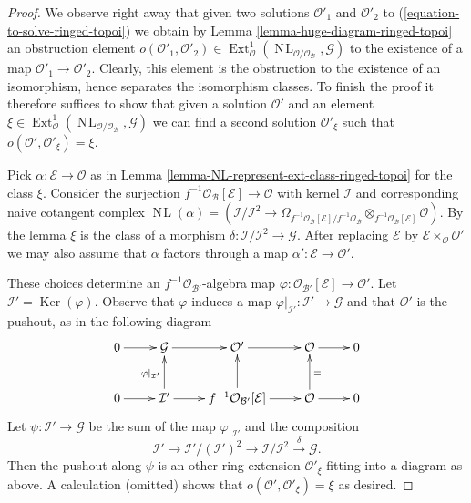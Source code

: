 \documentclass[10pt,a4paper]{amsart}
\theoremstyle{plain}
\theoremstyle{definition}
\theoremstyle{remark}
\numberwithin{equation}{subsection}
\def\Ext{\mathop{\mathrm{Ext}}\nolimits}
\def\NL{\mathop{N\!L}\nolimits}
\def\Ker{\mathop{\mathrm{Ker}}}
\begin{document}
\begin{proof}
We observe right away that given two solutions $\mathcal{O}'_1$ and
$\mathcal{O}'_2$ to (\ref{equation-to-solve-ringed-topoi}) we obtain by
Lemma \ref{lemma-huge-diagram-ringed-topoi} an obstruction element
$o(\mathcal{O}'_1, \mathcal{O}'_2) \in \Ext^1_\mathcal{O}(
\NL_{\mathcal{O}/\mathcal{O}_\mathcal{B}}, \mathcal{G})$
to the existence of a map $\mathcal{O}'_1 \to \mathcal{O}'_2$.
Clearly, this element
is the obstruction to the existence of an isomorphism, hence separates
the isomorphism classes. To finish the proof it therefore suffices to
show that given a solution $\mathcal{O}'$ and an element
$\xi \in \Ext^1_\mathcal{O}(
\NL_{\mathcal{O}/\mathcal{O}_\mathcal{B}}, \mathcal{G})$
we can find a second solution $\mathcal{O}'_\xi$ such that
$o(\mathcal{O}', \mathcal{O}'_\xi) = \xi$.

\medskip\noindent
Pick $\alpha : \mathcal{E} \to \mathcal{O}$ as in
Lemma \ref{lemma-NL-represent-ext-class-ringed-topoi}
for the class $\xi$. Consider the surjection
$f^{-1}\mathcal{O}_\mathcal{B}[\mathcal{E}] \to \mathcal{O}$
with kernel $\mathcal{I}$ and corresponding naive cotangent complex
$\NL(\alpha) = (\mathcal{I}/\mathcal{I}^2 \to
\Omega_{f^{-1}\mathcal{O}_\mathcal{B}[\mathcal{E}]/
f^{-1}\mathcal{O}_\mathcal{B}}
\otimes_{f^{-1}\mathcal{O}_\mathcal{B}[\mathcal{E}]} \mathcal{O})$.
By the lemma $\xi$ is the class of a morphism
$\delta : \mathcal{I}/\mathcal{I}^2 \to \mathcal{G}$.
After replacing $\mathcal{E}$ by
$\mathcal{E} \times_\mathcal{O} \mathcal{O}'$ we may also assume
that $\alpha$ factors through a map
$\alpha' : \mathcal{E} \to \mathcal{O}'$.

\medskip\noindent
These choices determine an $f^{-1}\mathcal{O}_{\mathcal{B}'}$-algebra map
$\varphi : \mathcal{O}_{\mathcal{B}'}[\mathcal{E}] \to \mathcal{O}'$.
Let $\mathcal{I}' = \Ker(\varphi)$.
Observe that $\varphi$ induces a map
$\varphi|_{\mathcal{I}'} : \mathcal{I}' \to \mathcal{G}$
and that $\mathcal{O}'$ is the pushout, as in the following
diagram
$$
\xymatrix{
0 \ar[r] & \mathcal{G} \ar[r] & \mathcal{O}' \ar[r] &
\mathcal{O} \ar[r] & 0 \\
0 \ar[r] & \mathcal{I}' \ar[u]^{\varphi|_{\mathcal{I}'}} \ar[r] &
f^{-1}\mathcal{O}_{\mathcal{B}'}[\mathcal{E}] \ar[u] \ar[r] &
\mathcal{O} \ar[u]_{=} \ar[r] & 0
}
$$
Let $\psi : \mathcal{I}' \to \mathcal{G}$ be the sum of the map
$\varphi|_{\mathcal{I}'}$ and the composition
$$
\mathcal{I}' \to \mathcal{I}'/(\mathcal{I}')^2 \to
\mathcal{I}/\mathcal{I}^2 \xrightarrow{\delta} \mathcal{G}.
$$
Then the pushout along $\psi$ is an other ring extension
$\mathcal{O}'_\xi$ fitting into a diagram as above.
A calculation (omitted) shows that $o(\mathcal{O}', \mathcal{O}'_\xi) = \xi$
as desired.
\end{proof}
\end{document}

